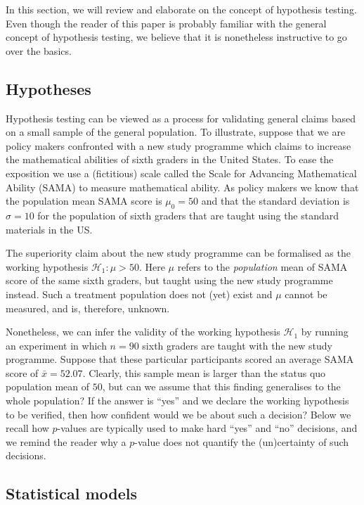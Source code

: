 \documentclass[english,,doc,floatsintext]{apa6}
\begin{document}
In this section, we will review and elaborate on the concept of hypothesis testing. Even though the reader of this paper is probably familiar with the general concept of hypothesis testing, we believe that it is nonetheless instructive to go over the basics.

\hypertarget{hypotheses}{%
\subsection{Hypotheses}\label{hypotheses}}

Hypothesis testing can be viewed as a process for validating general claims based on a small sample of the general population. To illustrate, suppose that we are policy makers confronted with a new study programme which claims to increase the mathematical abilities of sixth graders in the United States. To ease the exposition we use a (fictitious) scale called the Scale for Advancing Mathematical Ability (SAMA) to measure mathematical ability. As policy makers we know that the population mean SAMA score is \(\mu_{0}=50\) and that the standard deviation is \(\sigma=10\) for the population of sixth graders that are taught using the standard materials in the US.

The superiority claim about the new study programme can be formalised as the working hypothesis \(\mathcal{H}_{1} : \mu > 50\). Here \(\mu\) refers to the \emph{population} mean of SAMA score of the same sixth graders, but taught using the new study programme instead. Such a treatment population does not (yet) exist and \(\mu\) cannot be measured, and is, therefore, unknown.

Nonetheless, we can infer the validity of the working hypothesis \(\mathcal{H}_{1}\) by running an experiment in which \(n=90\) sixth graders are taught with the new study programme. Suppose that these particular participants scored an average SAMA score of \(\bar{x} = 52.07\). Clearly, this sample mean is larger than the status quo population mean of \(50\), but can we assume that this finding generalises to the whole population? If the answer is \enquote{yes} and we declare the working hypothesis to be verified, then how confident would we be about such a decision? Below we recall how \(p\)-values are typically used to make hard \enquote{yes} and \enquote{no} decisions, and we remind the reader why a \(p\)-value does not quantify the (un)certainty of such decisions.

\hypertarget{statistical-models}{%
\subsection{Statistical models}\label{statistical-models}}
\end{document}
